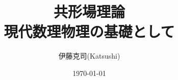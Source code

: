 \documentclass[a4paper,12pt]{ctexbook}
\begin{document}
\author{伊藤克司(Katsushi)}
\title{共形場理論\\現代数理物理の基礎として}
\date{\today}

\frontmatter
\maketitle
\tableofcontents

\mainmatter








\backmatter
\end{document}
